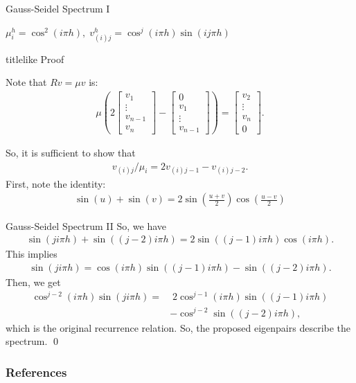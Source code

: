 \documentclass{beamer}
\begin{document}
\begin{frame}[label=gaussSeidelProof]{Gauss-Seidel Spectrum I}
 \begin{theorem}
  $\mu_i^h = \cos^2(i\pi h), \; v_{(i)j}^h = \cos^j(i\pi h)\sin(ij\pi h)$
 \end{theorem}
  \begin{beamercolorbox}{titlelike}
   Proof
  \end{beamercolorbox}
  
  Note that $Rv=\mu v$ is:
  \begin{align}
   \mu\left(2 \begin{bmatrix}v_1\\ \vdots \\ v_{n-1} \\ v_n \end{bmatrix} - \begin{bmatrix} 0 \\ v_1 \\ \vdots \\ v_{n-1} \end{bmatrix} \right) = \begin{bmatrix}v_2\\ \vdots \\ v_n \\ 0\end{bmatrix}.
  \end{align}

  So, it is sufficient to show that
  \begin{align}
   v_{(i)j}/\mu_i = 2v_{(i)j-1} - v_{(i)j-2}. \nonumber
  \end{align}
  First, note the identity:
  \begin{align}
   \sin(u)+\sin(v) = 2\sin\left(\frac{u+v}{2}\right)\cos\left(\frac{u-v}{2}\right) \nonumber
  \end{align}
\end{frame}
\begin{frame}{Gauss-Seidel Spectrum II}
  So, we have
  \begin{align}
   \sin(ji\pi h) + \sin((j-2)i\pi h) = 2 \sin\left( (j-1)i\pi h \right) \cos\left( i\pi h \right). \nonumber
  \end{align}
  This implies
  \begin{align}
   \sin(ji\pi h) = \cos(i \pi h) \sin((j-1)i\pi h) - \sin((j-2)i\pi h). \nonumber
  \end{align}
  Then, we get
  \begin{align}
   \cos^{j-2}(i\pi h)\sin(ji\pi h) =& \; 2\cos^{j-1}(i \pi h) \sin((j-1)i\pi h) \nonumber \\
                                      &- \cos^{j-2}\sin((j-2)i\pi h), \nonumber
  \end{align}
  which is the original recurrence relation.
  So, the proposed eigenpairs describe the spectrum.
  \qed \\
  \hyperlink{gaussSeidel}{}
\end{frame}

\begin{frame}[allowframebreaks]
 \nocite{*}
 \frametitle{References}
 
 
\end{frame}
\end{document}
